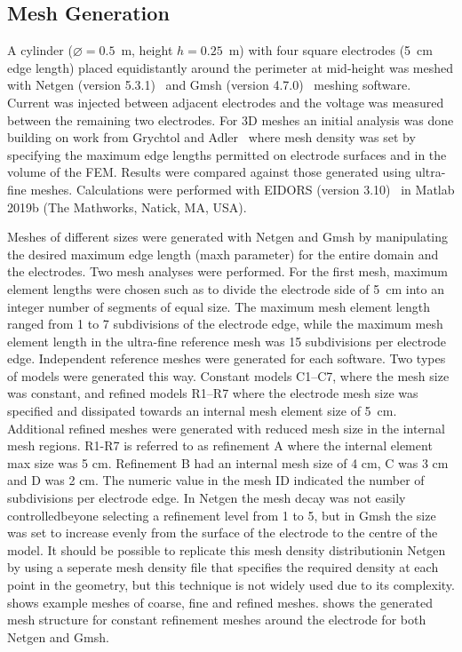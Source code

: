 \subsection{Mesh Generation}
A cylinder ($\diameter=0.5$~m, height $h=0.25$~m) with four square electrodes 
(5~cm edge length) placed equidistantly around the perimeter at mid-height was
meshed with Netgen (version 5.3.1)~\parencite{schoberl_netgen_1997} and Gmsh 
(version 4.7.0)~\parencite{geuzaine_gmsh_2009}
meshing software.
Current was injected between adjacent electrodes and the voltage was measured between the remaining
two electrodes.
For 3D meshes an initial analysis was done building on work from 
Grychtol and Adler~\parencite{grychtol_fem_2013} where mesh density was
set by specifying the maximum edge lengths permitted on electrode surfaces
and in the volume of the FEM.
Results were compared against those generated using ultra-fine meshes. 
Calculations were performed with EIDORS (version 3.10)~\parencite{adler_uses_2006} 
in Matlab 2019b
(The Mathworks, Natick, MA, USA).


Meshes of different sizes were generated with Netgen and Gmsh by manipulating the desired
maximum edge length (maxh parameter) for the entire domain and the electrodes.
Two  mesh analyses were performed. For the first
mesh, maximum element lengths were
chosen such as to divide the electrode side of 5~cm into an integer number of
segments of equal size. 
The maximum mesh element length ranged from 1 to 7 subdivisions of the electrode 
edge, while the maximum mesh element length in the ultra-fine reference mesh  
was 15 subdivisions per 
electrode edge. Independent reference meshes were generated for each software.
Two types of models were generated this way. Constant models C1--C7, where the mesh size 
was constant, and refined models R1--R7 where the electrode mesh size was specified and 
dissipated towards an internal mesh element size of 5 cm. Additional refined meshes were
generated with reduced mesh size in the internal mesh regions.  
R1-R7 is referred to as refinement A where the internal element max size was 5 cm. Refinement 
B had an internal mesh size of 4 cm, C was 3 cm and D was 2 cm.
The numeric value in the mesh 
ID indicated the number of subdivisions per electrode edge. 
In Netgen the mesh decay was not easily controlledbeyone selecting a refinement 
level from 1 to 5, but in Gmsh the size was set 
to increase evenly from the surface of the electrode to the centre of the model.
It should be possible to replicate this mesh density distributionin Netgen by using a 
seperate mesh density file that specifies the required density at each point in the geometry,
but this technique is not widely used due to its complexity.
 shows example meshes of coarse, fine and refined
meshes.  shows the generated mesh structure for 
constant refinement meshes around the electrode 
for both Netgen and Gmsh. 


